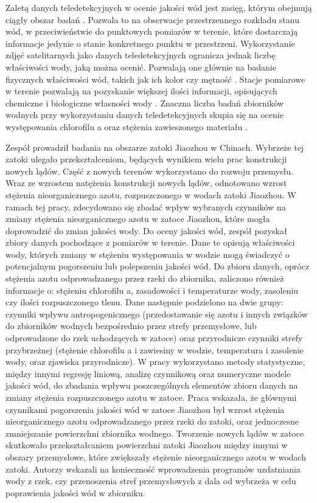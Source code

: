 \documentclass{amuthesis}
\begin{document}
Zaletą danych teledetekcyjnych w ocenie jakości wód jest zasięg, którym
obejmują ciągły obszar badań \autocite{gholizadeh2016comprehensive}.
Pozwala to na obserwacje przestrzennego rozkładu stanu wód, w
przeciwieństwie do punktowych pomiarów w terenie, które dostarczają
informacje jedynie o stanie konkretnego punktu w przestrzeni.
Wykorzystanie zdjęć satelitarnych jako danych teledetekcyjnych ogranicza
jednak liczbę właściwości wody, jaką można ocenić. Pozwalają one głównie
na badanie fizycznych właściwości wód, takich jak ich kolor czy mętność
\autocite{glasgow2004real}. Stacje pomiarowe w terenie pozwalają na
pozyskanie większej ilości informacji, opisujących chemiczne i
biologiczne własności wody \autocite{summers2020water}. Znaczna liczba
badań zbiorników wodnych przy wykorzystaniu danych teledetekcyjnych
skupia się na ocenie występowania chlorofilu a oraz stężenia
zawieszonego materiału \autocite{gholizadeh2016comprehensive}.

Zespół \textcite{zhang2017assessment} prowadził badania na obszarze
zatoki Jiaozhou w Chinach. Wybrzeże tej zatoki ulegało przekształceniom,
będących wynikiem wielu prac konstrukcji nowych lądów. Część z nowych
terenów wykorzystano do rozwoju przemysłu. Wraz ze wzrostem natężenia
konstrukcji nowych lądów, odnotowano wzrost stężenia nieorganicznego
azotu, rozpuszczonego w wodach zatoki Jiaozhou. W ramach tej pracy,
zdecydowano się zbadać wpływ wybranych czynników na zmiany stężenia
nieorganicznego azotu w zatoce Jiaozhou, które mogła doprowadzić do
zmian jakości wody. Do oceny jakości wód, zespół pozyskał zbiory danych
pochodzące z pomiarów w terenie. Dane te opisują właściwości wody,
których zmiany w stężeniu występowania w wodzie mogą świadczyć o
potencjalnym pogorszeniu lub polepszeniu jakości wód. Do zbioru danych,
oprócz stężenia azotu odprowadzanego przez rzeki do zbiornika, zaliczono
również informacje o: stężeniu chlorofilu a, zasadowości i temperaturze
wody, zasoleniu czy ilości rozpuszczonego tlenu. Dane następnie
podzielono na dwie grupy: czynniki wpływu antropogenicznego
(przedostawanie się azotu i innych związków do zbiorników wodnych
bezpośrednio przez strefy przemysłowe, lub odprowadzone do rzek
uchodzących w zatoce) oraz przyrodnicze czynniki strefy przybrzeżnej
(stężenie chlorofilu a i zawiesiny w wodzie, temperatura i zasolenie
wody, oraz zjawiska przyrodnicze). W pracy wykorzystano metody
statystyczne, między innymi regresję liniową, analizę czynnikową oraz
numeryczne modele jakości wód, do zbadania wpływu poszczególnych
elementów zbioru danych na zmiany stężenia rozpuszczonego azotu w
zatoce. Praca wskazała, że głównymi czynnikami pogorszenia jakości wód w
zatoce Jiaozhou był wzrost stężenia nieorganicznego azotu odprowadzanego
przez rzeki do zatoki, oraz jednoczesne zmniejszanie powierzchni
zbiornika wodnego. Tworzenie nowych lądów w zatoce skutkowało
przekształcaniem powierzchni zatoki Jiaozhou między innymi w obszary
przemysłowe, które zwiększały stężenie nieorganicznego azotu w wodach
zatoki. Autorzy wskazali na konieczność wprowadzenia programów
uzdatniania wody z rzek, czy przenoszenia stref przemysłowych z dala od
wybrzeża w celu poprawienia jakości wód w zbiorniku.
\end{document}
